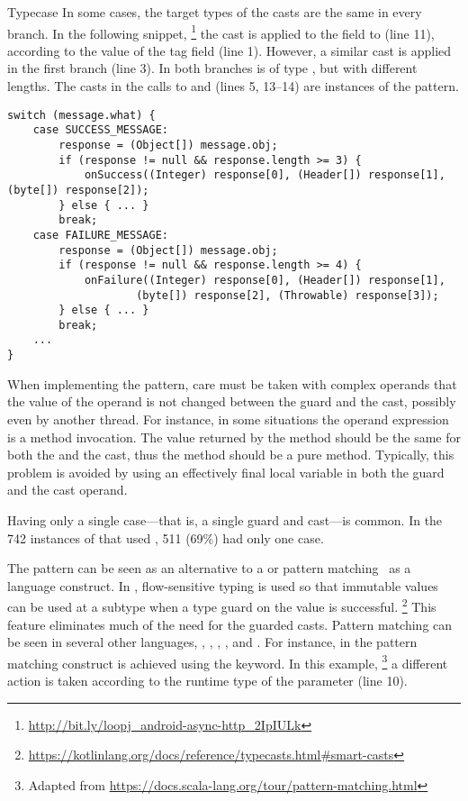 \begin{pattern}{Typecase}
In some cases, the target types of the casts are the same in every branch.
In the following snippet,%
\footnote{\url{http://bit.ly/loopj_android-async-http_2IpIULk}}
the cast is applied to the  field to (line 11),
according to the value of the tag  field (line 1).
However, a similar cast is applied in the first branch (line 3).
In both branches  is of type ,
  but with different lengths.
  The casts in the calls to  and
   (lines 5, 13--14) are instances of the
   pattern.

\begin{verbatim}
switch (message.what) {
    case SUCCESS_MESSAGE:
        response = (Object[]) message.obj;
        if (response != null && response.length >= 3) {
            onSuccess((Integer) response[0], (Header[]) response[1], (byte[]) response[2]);
        } else { ... }
        break;
    case FAILURE_MESSAGE:
        response = (Object[]) message.obj;
        if (response != null && response.length >= 4) {
            onFailure((Integer) response[0], (Header[]) response[1],
                    (byte[]) response[2], (Throwable) response[3]);
        } else { ... }
        break;
    ...
}
\end{verbatim}


\detection{}
When implementing the pattern,
care must be taken with complex operands that the value of the operand is
not changed between the guard and the cast, possibly even by another thread.
For instance, in some situations the operand expression is a method invocation.
The value returned by the method should be the same for both the
 and the cast, thus the method should be a pure method.
Typically, this problem is avoided by using an effectively final local variable in both the guard and the
cast operand.

\discussion{}
Having only a single case---that is, a single guard and cast---is common.
In the 742 instances of \thisp{} that used , 511
(69\%) had only one case.

The \thisp{} pattern can be seen as an \adhoc{} alternative to a
 or pattern matching~\citep{milnerProposalStandardML1984} as a
language construct.
In \kotlin{}, flow-sensitive typing is used so that immutable values can be
used at a subtype when a type guard on the value is successful.%
\footnote{\url{https://kotlinlang.org/docs/reference/typecasts.html\#smart-casts}}
This feature eliminates much of the need for the guarded casts.
Pattern matching can be seen in several other languages, \eg, \ml{}, \scala{}, \csharp{}, and \haskell{}.
For instance, in \scala{} the pattern matching construct is achieved using the  keyword.
In this example,%
\footnote{Adapted from \url{https://docs.scala-lang.org/tour/pattern-matching.html}}
a different action is taken according to the runtime type of the parameter  (line 10).


\end{pattern}
